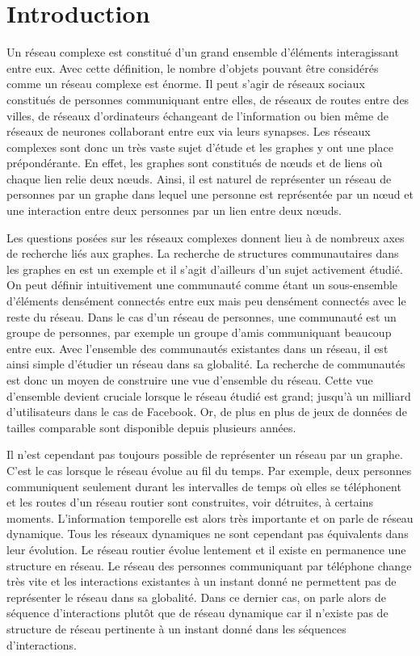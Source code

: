 
\chapter*{Introduction}

Un réseau complexe est constitué d'un grand ensemble d'éléments interagissant entre eux.
Avec cette définition, le nombre d'objets pouvant être considérés comme un réseau complexe est énorme.
Il peut s'agir de réseaux sociaux constitués de personnes communiquant entre elles, de réseaux de routes entre des villes, de réseaux d'ordinateurs échangeant de l'information ou bien même de réseaux de neurones collaborant entre eux via leurs synapses.
Les réseaux complexes sont donc un très vaste sujet d'étude et les graphes y ont une place prépondérante.
En effet, les graphes sont constitués de n\oe{}uds et de liens où chaque lien relie deux n\oe{}uds.
Ainsi, il est naturel de représenter un réseau de personnes par un graphe dans lequel une personne est représentée par un n\oe{}ud et une interaction entre deux personnes par un lien entre deux n\oe{}uds.

Les questions posées sur les réseaux complexes donnent lieu à de nombreux axes de recherche liés aux graphes.
La recherche de structures communautaires dans les graphes en est un exemple et il s'agit d'ailleurs d'un sujet activement étudié.
On peut définir intuitivement une communauté comme étant un sous-ensemble d’éléments densément connectés entre eux mais peu densément connectés avec le reste du réseau.
Dans le cas d'un réseau de personnes, une communauté est un groupe de personnes, par exemple un groupe d'amis communiquant beaucoup entre eux.
Avec l'ensemble des communautés existantes dans un réseau, il est ainsi simple d'étudier un réseau dans sa globalité.
La recherche de communautés est donc un moyen de construire une vue d'ensemble du réseau.
Cette vue d'ensemble devient cruciale lorsque le réseau étudié est grand; jusqu'à un milliard d'utilisateurs dans le cas de Facebook.
Or, de plus en plus de jeux de données de tailles comparable sont disponible depuis plusieurs années.


Il n'est cependant pas toujours possible de représenter un réseau par un graphe.
C'est le cas lorsque le réseau évolue au fil du temps.
Par exemple, deux personnes communiquent seulement durant les intervalles de temps où elles se téléphonent et les routes d'un réseau routier sont construites, voir détruites, à certains moments.
L'information temporelle est alors très importante et on parle de réseau dynamique.
Tous les réseaux dynamiques ne sont cependant pas équivalents dans leur évolution.
Le réseau routier évolue lentement et il existe en permanence une structure en réseau.
Le réseau des personnes communiquant par téléphone change très vite et les interactions existantes à un instant donné ne permettent pas de représenter le réseau dans sa globalité.
Dans ce dernier cas, on parle alors de séquence d'interactions plutôt que de réseau dynamique car il n'existe pas de structure de réseau pertinente à un instant donné dans les séquences d'interactions.


